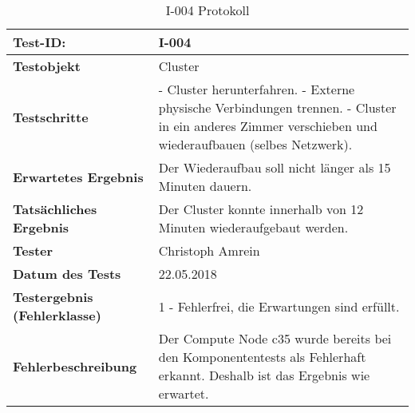 \begin{table}[H]
\centering
\begin{tabular}{p{4.5cm}p{11.5cm}}
\hline
\cellcolor{heading}\textbf{Test-ID:} & I-004 \\\hline
\cellcolor{heading}\textbf{Testobjekt} & Cluster \\\hline
\cellcolor{heading}\textbf{Testschritte} & 
- Cluster herunterfahren.\newline
- Externe physische Verbindungen trennen.\newline
- Cluster in ein anderes Zimmer verschieben und wiederaufbauen (selbes Netzwerk). \\\hline
\cellcolor{heading}\textbf{Erwartetes Ergebnis} & Der Wiederaufbau soll nicht länger als 15 Minuten dauern. \\\hline
\cellcolor{heading}\textbf{Tatsächliches Ergebnis} &
Der Cluster konnte innerhalb von 12 Minuten wiederaufgebaut werden. \\\hline
\cellcolor{heading}\textbf{Tester} & Christoph Amrein  \\\hline
\cellcolor{heading}\textbf{Datum des Tests} & 22.05.2018  \\\hline
\cellcolor{heading}\textbf{Testergebnis \newline (Fehlerklasse)} & 1 - Fehlerfrei, die Erwartungen sind erfüllt. \\\hline
\cellcolor{heading}\textbf{Fehlerbeschreibung} & Der Compute Node c35 wurde bereits bei den Komponententests als Fehlerhaft erkannt. Deshalb ist das Ergebnis wie erwartet.  \\\hline
\end{tabular}
\caption{I-004 Protokoll}
\end{table}
\newpage
